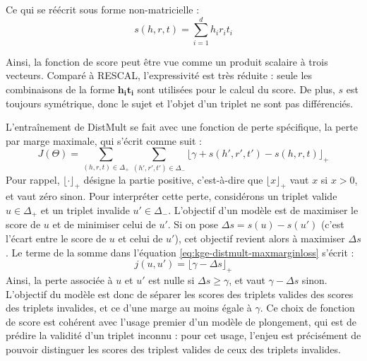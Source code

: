 Ce qui se réécrit sous forme non-matricielle :
\begin{equation}
    s(h, r, t) = \sum_{i=1}^{d} h_i r_i t_i
    \label{eq:kge-distmult-scorenv}
\end{equation}

Ainsi, la fonction de score peut être vue comme un produit scalaire à trois vecteurs. Comparé à RESCAL, l'expressivité est très réduite : seule les combinaisons de la forme $\mathbf{h_i t_i}$ sont utilisées pour le calcul du score. De plus, $s$ est toujours symétrique, donc le sujet et l'objet d'un triplet ne sont pas différenciés.



L'entraînement de DistMult se fait avec une fonction de perte spécifique, la perte par marge maximale, qui s'écrit comme suit :
\begin{equation}
    J(\Theta) = \sum_{(h, r, t) \in \Delta_+} \sum_{(h', r', t') \in \Delta_-} \lfloor \gamma + s(h', r', t') - s(h, r, t) \rfloor_+
    \label{eq:kge-distmult-maxmarginloss}
\end{equation}
Pour rappel, $\lfloor \cdot \rfloor_+$ désigne la partie positive, c'est-à-dire que $\lfloor x \rfloor_+$ vaut $x$ si $x > 0$, et vaut zéro sinon. Pour interpréter cette perte, considérons un triplet valide $u \in \Delta_+$ et un triplet invalide $u' \in \Delta_-$. L'objectif d'un modèle est de maximiser le score de $u$ et de minimiser celui de $u'$. Si on pose $\Delta s = s(u) - s(u')$ (c'est l'écart entre le score de $u$ et celui de $u'$), cet objectif revient alors à maximiser $\Delta s$. Le terme de la somme dans l'équation \ref{eq:kge-distmult-maxmarginloss} s'écrit :
\begin{equation}
    j(u, u') = \lfloor \gamma - \Delta s \rfloor_+
\end{equation}
Ainsi, la perte associée à $u$ et $u'$ est nulle si $\Delta s \geq \gamma$, et vaut $\gamma - \Delta s$ sinon. L'objectif du modèle est donc de séparer les scores des triplets valides des scores des triplets invalides, et ce d'une marge au moins égale à $\gamma$. Ce choix de fonction de score est cohérent avec l'usage premier d'un modèle de plongement, qui est de prédire la validité d'un triplet inconnu : pour cet usage, l'enjeu est précisément de pouvoir distinguer les scores des triplest valides de ceux des triplets invalides.

